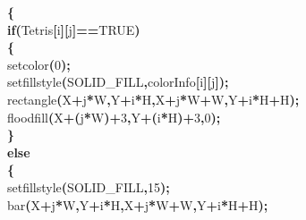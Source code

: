 \documentclass[a4paper, 10pt]{article}
\newcommand\SPC{\hspace*{0.6em}}
\newcommand{\CppAIdentifier}[1]{#1}
\newcommand{\CppANumber}[1]{\textcolor[rgb]{0.5,0,0.5}{#1}}
\newcommand{\CppAReservedWord}[1]{\textbf{#1}}
\newcommand{\CppASpace}[1]{\colorbox[rgb]{1,1,1}{#1}}
\newcommand{\CppASymbol}[1]{\textbf{\textcolor[rgb]{1,0,0}{#1}}}
\begin{document}
\begin{ttfamily}
\CppASpace{\SPC \SPC \SPC }\CppASymbol{\{}\\
\CppASpace{\SPC \SPC \SPC \SPC }\CppAReservedWord{if}\CppASymbol{(}\CppAIdentifier{Tetris}\CppASymbol{[}\CppAIdentifier{i}\CppASymbol{]}\CppASymbol{[}\CppAIdentifier{j}\CppASymbol{]}\CppASymbol{==}\CppAIdentifier{TRUE}\CppASymbol{)}\\
\CppASpace{\SPC \SPC \SPC \SPC }\CppASymbol{\{}\\
\CppASpace{\SPC \SPC \SPC \SPC \SPC }\CppAIdentifier{setcolor}\CppASymbol{(}\CppANumber{0}\CppASymbol{)}\CppASymbol{;}\\
\CppASpace{\SPC \SPC \SPC \SPC \SPC }\CppAIdentifier{setfillstyle}\CppASymbol{(}\CppAIdentifier{SOLID\_FILL}\CppASymbol{,}\CppAIdentifier{colorInfo}\CppASymbol{[}\CppAIdentifier{i}\CppASymbol{]}\CppASymbol{[}\CppAIdentifier{j}\CppASymbol{]}\CppASymbol{)}\CppASymbol{;}\\
\CppASpace{\SPC \SPC \SPC \SPC \SPC }\CppAIdentifier{rectangle}\CppASymbol{(}\CppAIdentifier{X}\CppASymbol{+}\CppAIdentifier{j}\CppASymbol{*}\CppAIdentifier{W}\CppASymbol{,}\CppAIdentifier{Y}\CppASymbol{+}\CppAIdentifier{i}\CppASymbol{*}\CppAIdentifier{H}\CppASymbol{,}\CppAIdentifier{X}\CppASymbol{+}\CppAIdentifier{j}\CppASymbol{*}\CppAIdentifier{W}\CppASymbol{+}\CppAIdentifier{W}\CppASymbol{,}\CppAIdentifier{Y}\CppASymbol{+}\CppAIdentifier{i}\CppASymbol{*}\CppAIdentifier{H}\CppASymbol{+}\CppAIdentifier{H}\CppASymbol{)}\CppASymbol{;}\\
\CppASpace{\SPC \SPC \SPC \SPC \SPC }\CppAIdentifier{floodfill}\CppASymbol{(}\CppAIdentifier{X}\CppASymbol{+}\CppASymbol{(}\CppAIdentifier{j}\CppASymbol{*}\CppAIdentifier{W}\CppASymbol{)}\CppASymbol{+}\CppANumber{3}\CppASymbol{,}\CppAIdentifier{Y}\CppASymbol{+}\CppASymbol{(}\CppAIdentifier{i}\CppASymbol{*}\CppAIdentifier{H}\CppASymbol{)}\CppASymbol{+}\CppANumber{3}\CppASymbol{,}\CppANumber{0}\CppASymbol{)}\CppASymbol{;}\\
\CppASpace{\SPC \SPC \SPC \SPC }\CppASymbol{\}}\\
\CppASpace{\SPC \SPC \SPC \SPC }\CppAReservedWord{else}\\
\CppASpace{\SPC \SPC \SPC \SPC }\CppASymbol{\{}\\
\CppASpace{\SPC \SPC \SPC \SPC \SPC }\CppAIdentifier{setfillstyle}\CppASymbol{(}\CppAIdentifier{SOLID\_FILL}\CppASymbol{,}\CppANumber{15}\CppASymbol{)}\CppASymbol{;}\\
\CppASpace{\SPC \SPC \SPC \SPC \SPC }\CppAIdentifier{bar}\CppASymbol{(}\CppAIdentifier{X}\CppASymbol{+}\CppAIdentifier{j}\CppASymbol{*}\CppAIdentifier{W}\CppASymbol{,}\CppAIdentifier{Y}\CppASymbol{+}\CppAIdentifier{i}\CppASymbol{*}\CppAIdentifier{H}\CppASymbol{,}\CppAIdentifier{X}\CppASymbol{+}\CppAIdentifier{j}\CppASymbol{*}\CppAIdentifier{W}\CppASymbol{+}\CppAIdentifier{W}\CppASymbol{,}\CppAIdentifier{Y}\CppASymbol{+}\CppAIdentifier{i}\CppASymbol{*}\CppAIdentifier{H}\CppASymbol{+}\CppAIdentifier{H}\CppASymbol{)}\CppASymbol{;}\\

\end{ttfamily}
\end{document}
